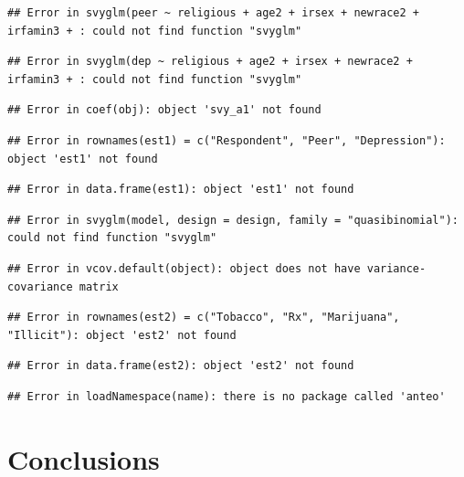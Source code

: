 \documentclass[]{DissertateUSU}
\begin{document}
\begin{verbatim}
## Error in svyglm(peer ~ religious + age2 + irsex + newrace2 + irfamin3 + : could not find function "svyglm"
\end{verbatim}

\begin{verbatim}
## Error in svyglm(dep ~ religious + age2 + irsex + newrace2 + irfamin3 + : could not find function "svyglm"
\end{verbatim}

\begin{verbatim}
## Error in coef(obj): object 'svy_a1' not found
\end{verbatim}

\begin{verbatim}
## Error in rownames(est1) = c("Respondent", "Peer", "Depression"): object 'est1' not found
\end{verbatim}

\begin{verbatim}
## Error in data.frame(est1): object 'est1' not found
\end{verbatim}

\begin{verbatim}
## Error in svyglm(model, design = design, family = "quasibinomial"): could not find function "svyglm"
\end{verbatim}

\begin{verbatim}
## Error in vcov.default(object): object does not have variance-covariance matrix
\end{verbatim}

\begin{verbatim}
## Error in rownames(est2) = c("Tobacco", "Rx", "Marijuana", "Illicit"): object 'est2' not found
\end{verbatim}

\begin{verbatim}
## Error in data.frame(est2): object 'est2' not found
\end{verbatim}

\begin{verbatim}
## Error in loadNamespace(name): there is no package called 'anteo'
\end{verbatim}

\section{Conclusions}\label{conclusions}

\singlespacing
\end{document}
